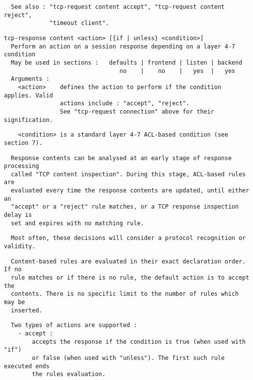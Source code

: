 \begin{verbatim}
  See also : "tcp-request content accept", "tcp-request content reject",
             "timeout client".
\end{verbatim}

\begin{verbatim}
tcp-response content <action> [{if | unless} <condition>]
  Perform an action on a session response depending on a layer 4-7 condition
  May be used in sections :   defaults | frontend | listen | backend
                                 no    |    no    |   yes  |   yes
  Arguments :
    <action>    defines the action to perform if the condition applies. Valid
                actions include : "accept", "reject".
                See "tcp-request connection" above for their signification.
\end{verbatim}

\begin{verbatim}
    <condition> is a standard layer 4-7 ACL-based condition (see section 7).
\end{verbatim}

\begin{verbatim}
  Response contents can be analysed at an early stage of response processing
  called "TCP content inspection". During this stage, ACL-based rules are
  evaluated every time the response contents are updated, until either an
  "accept" or a "reject" rule matches, or a TCP response inspection delay is
  set and expires with no matching rule. 
\end{verbatim}

\begin{verbatim}
  Most often, these decisions will consider a protocol recognition or validity.
\end{verbatim}

\begin{verbatim}
  Content-based rules are evaluated in their exact declaration order. If no
  rule matches or if there is no rule, the default action is to accept the
  contents. There is no specific limit to the number of rules which may be
  inserted.
\end{verbatim}

\begin{verbatim}
  Two types of actions are supported :
    - accept :
        accepts the response if the condition is true (when used with "if")
        or false (when used with "unless"). The first such rule executed ends
        the rules evaluation.
\end{verbatim}

